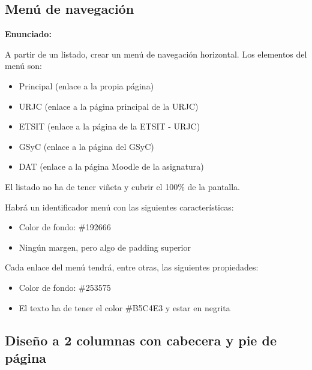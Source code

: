 \subsection{Menú de navegación}
\label{subsec:menuNavegacion}

\textbf{Enunciado:}

A partir de un listado, crear un menú de navegación horizontal. Los elementos del menú son:

\begin{itemize}
  \item Principal (enlace a la propia página)
  \item URJC (enlace a la página principal de la URJC)
  \item ETSIT (enlace a la página de la ETSIT - URJC)
  \item GSyC (enlace a la página del GSyC)
  \item DAT (enlace a la página Moodle de la asignatura)
\end{itemize}

El listado no ha de tener viñeta y cubrir el 100\% de la pantalla.

Habrá un identificador menú con las siguientes características:

\begin{itemize}
  \item Color de fondo: \#192666
  \item Ningún margen, pero algo de padding superior
\end{itemize}

Cada enlace del menú tendrá, entre otras, las siguientes propiedades:

\begin{itemize}
  \item Color de fondo: \#253575
  \item El texto ha de tener el color \#B5C4E3 y estar en negrita
\end{itemize}

\subsection{Diseño a 2 columnas con cabecera y pie de página}
\label{subsec:2columnas}

